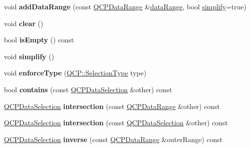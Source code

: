 \begin{DoxyCompactItemize}
\item 
void {\bfseries add\+Data\+Range} (const \hyperlink{class_q_c_p_data_range}{Q\+C\+P\+Data\+Range} \&\hyperlink{class_q_c_p_data_selection_a6a9c39a2019cd6d2fdd329f415262b34}{data\+Range}, bool \hyperlink{class_q_c_p_data_selection_a4a2fbad1a6e4d1dd26fdfdf88956f2a4}{simplify}=true)\hypertarget{class_q_c_p_data_selection_a46740c5aa7b80ae9b2abf6985d61b74f}{}\label{class_q_c_p_data_selection_a46740c5aa7b80ae9b2abf6985d61b74f}

\item 
void {\bfseries clear} ()\hypertarget{class_q_c_p_data_selection_a385dd665e6690d39afb8bbd727b1e00b}{}\label{class_q_c_p_data_selection_a385dd665e6690d39afb8bbd727b1e00b}

\item 
bool {\bfseries is\+Empty} () const \hypertarget{class_q_c_p_data_selection_a9d77ad4a54418bd0b74ef6b8076561d0}{}\label{class_q_c_p_data_selection_a9d77ad4a54418bd0b74ef6b8076561d0}

\item 
void {\bfseries simplify} ()\hypertarget{class_q_c_p_data_selection_a4a2fbad1a6e4d1dd26fdfdf88956f2a4}{}\label{class_q_c_p_data_selection_a4a2fbad1a6e4d1dd26fdfdf88956f2a4}

\item 
void {\bfseries enforce\+Type} (\hyperlink{namespace_q_c_p_ac6cb9db26a564b27feda362a438db038}{Q\+C\+P\+::\+Selection\+Type} type)\hypertarget{class_q_c_p_data_selection_a17b84d852911531d229f4a76aa239a75}{}\label{class_q_c_p_data_selection_a17b84d852911531d229f4a76aa239a75}

\item 
bool {\bfseries contains} (const \hyperlink{class_q_c_p_data_selection}{Q\+C\+P\+Data\+Selection} \&other) const \hypertarget{class_q_c_p_data_selection_a6d7c10d033031c7d1c66948ab8beab0f}{}\label{class_q_c_p_data_selection_a6d7c10d033031c7d1c66948ab8beab0f}

\item 
\hyperlink{class_q_c_p_data_selection}{Q\+C\+P\+Data\+Selection} {\bfseries intersection} (const \hyperlink{class_q_c_p_data_range}{Q\+C\+P\+Data\+Range} \&other) const \hypertarget{class_q_c_p_data_selection_a08371e0e97001f5f688047223123958b}{}\label{class_q_c_p_data_selection_a08371e0e97001f5f688047223123958b}

\item 
\hyperlink{class_q_c_p_data_selection}{Q\+C\+P\+Data\+Selection} {\bfseries intersection} (const \hyperlink{class_q_c_p_data_selection}{Q\+C\+P\+Data\+Selection} \&other) const \hypertarget{class_q_c_p_data_selection_adc25bacbc7268595b684ab060de351d7}{}\label{class_q_c_p_data_selection_adc25bacbc7268595b684ab060de351d7}

\item 
\hyperlink{class_q_c_p_data_selection}{Q\+C\+P\+Data\+Selection} {\bfseries inverse} (const \hyperlink{class_q_c_p_data_range}{Q\+C\+P\+Data\+Range} \&outer\+Range) const \hypertarget{class_q_c_p_data_selection_a02c6253d87d72b8defbee2e6bfa8a494}{}\label{class_q_c_p_data_selection_a02c6253d87d72b8defbee2e6bfa8a494}

\end{DoxyCompactItemize}
